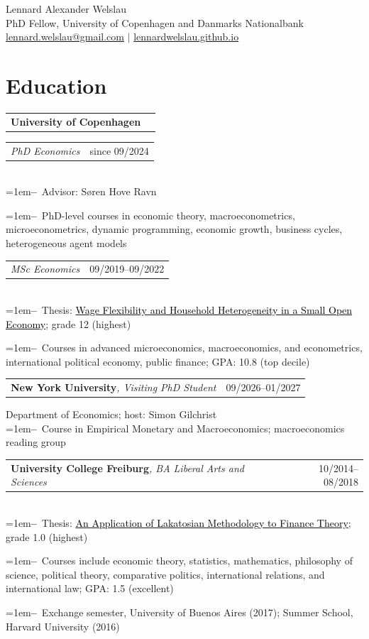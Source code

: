 \documentclass[a4paper,11pt]{article}
\makeatletter
\newlength{\entrygap}      \setlength{\entrygap}{5pt}
\newlength{\rolegap}       \setlength{\rolegap}{3pt}
\newcommand{\cvrow}[2]{%
  \begin{tabular*}{\textwidth}[t]{@{}l@{\extracolsep{\fill}}r@{}}
    #1 & {\footnotesize #2} \\
  \end{tabular*}
}
\newcommand{\cventry}[4]{\cvrow{\textbf{#1}\textit{\small #2}}{#3}
  {\small #4}
  \vspace{\entrygap}}
\newcommand{\cvhead}[1]{%
  \begin{tabular*}{\textwidth}[t]{@{}l@{\extracolsep{\fill}}r@{}}
    \textbf{#1} & \\
  \end{tabular*}%
  \par\nobreak
}
\newcommand{\cvrole}[3]{\cvrow{\textit{\small #1}}{#2}
  {\small #3}}
\newcommand{\cvrolelast}[3]{\vspace{\rolegap}\cvrole{#1}{#2}{#3}\vspace{\entrygap}}
\newcommand{\myitem}[1]{\hangindent=1em\hangafter=1\textbf{--}~#1\par}
\newcommand{\blacklink}[2]{\href{#1}{\textcolor{black}{#2}}}
\newcommand{\site}{https://lennardwelslau.github.io/research/}
\makeatother
\begin{document}
\begin{center}
    {\Large Lennard Alexander Welslau} \\[2pt]
    PhD Fellow, University of Copenhagen and Danmarks Nationalbank \\
    \href{mailto:lennard.welslau@gmail.com}{lennard.welslau@gmail.com} $|$
    \href{https://lennardwelslau.github.io/}{lennardwelslau.github.io}
\end{center}


\section{Education}

\cvhead{University of Copenhagen}

\cvrole{PhD Economics}{since 09/2024}
{\\
\myitem{Advisor: Søren Hove Ravn}
\myitem{PhD-level courses in economic theory, macroeconometrics, microeconometrics,
dynamic programming, economic growth, business cycles, heterogeneous agent models}
}

\cvrolelast{MSc Economics}{09/2019--09/2022}
{\\
\myitem{Thesis: \blacklink{\site welslau-2022-wage-flexibility-hank.pdf}{Wage Flexibility and Household Heterogeneity in a Small Open Economy}; grade 12 (highest)}
\myitem{Courses in advanced microeconomics, macroeconomics, and econometrics, international political economy,
public finance; GPA: 10.8 (top decile)}
}

\cventry{New York University}{, Visiting PhD Student}{09/2026--01/2027}
{Department of Economics; host: Simon Gilchrist \\
\myitem{Course in Empirical Monetary and Macroeconomics; macroeconomics reading group}}

\cventry{University College Freiburg}{, BA Liberal Arts and Sciences}{10/2014--08/2018}
{\\
\myitem{Thesis: \blacklink{\site welslau-2018-lakatos-finance-theory-ba-thesis.pdf}{An Application of Lakatosian Methodology to Finance Theory}; grade 1.0 (highest)}
\myitem{Courses include economic theory, statistics, mathematics, philosophy of science, political theory,
comparative politics, international relations, and international law; GPA: 1.5 (excellent)}
\myitem{Exchange semester, University of Buenos Aires (2017); Summer School, Harvard University (2016)}
}
\end{document}
